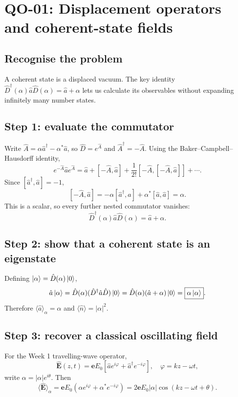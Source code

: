
\section{QO-01: Displacement operators and coherent-state fields}
\subsection*{Recognise the problem}
A coherent state is a displaced vacuum. The key identity
\(\hat D^\dagger(\alpha)\hat a\hat D(\alpha)=\hat a+\alpha\)
lets us calculate its observables without expanding infinitely many
number states.

\subsection*{Step 1: evaluate the commutator}
Write \(\hat A=\alpha\hat a^\dagger-\alpha^*\hat a\), so
\(\hat D=e^{\hat A}\) and \(\hat A^\dagger=-\hat A\).
Using the Baker--Campbell--Hausdorff identity,
\[
e^{-\hat A}\hat a e^{\hat A}
=\hat a+[-\hat A,\hat a]
+\frac1{2!}[-\hat A,[-\hat A,\hat a]]+\cdots .
\]
Since \([\hat a^\dagger,\hat a]=-1\),
\[
[-\hat A,\hat a]=-\alpha[\hat a^\dagger,\hat a]
+\alpha^*[\hat a,\hat a]=\alpha .
\]
This is a scalar, so every further nested commutator vanishes:
\[
\boxed{\hat D^\dagger(\alpha)\hat a\hat D(\alpha)=\hat a+\alpha.}
\]

\subsection*{Step 2: show that a coherent state is an eigenstate}
Defining \(\left\lvert \alpha\right\rangle=\hat D(\alpha)\left\lvert 0\right\rangle\),
\[
\hat a\left\lvert \alpha\right\rangle
=\hat D(\alpha)(\hat D^\dagger\hat a\hat D)\left\lvert 0\right\rangle
=\hat D(\alpha)(\hat a+\alpha)\left\lvert 0\right\rangle
=\boxed{\alpha\left\lvert \alpha\right\rangle}.
\]
Therefore \(\langle\hat a\rangle_\alpha=\alpha\) and
\(\langle\hat n\rangle=|\alpha|^2\).

\subsection*{Step 3: recover a classical oscillating field}
For the Week 1 travelling-wave operator,
\[
\hat{\mathbf E}(z,t)=\mathbf e E_0
[\hat a e^{i\varphi}+\hat a^\dagger e^{-i\varphi}],
\quad \varphi=kz-\omega t,
\]
write \(\alpha=|\alpha|e^{i\theta}\). Then
\[
\langle\hat{\mathbf E}\rangle_\alpha
=\mathbf eE_0(\alpha e^{i\varphi}+\alpha^*e^{-i\varphi})
=\boxed{2\mathbf e E_0|\alpha|\cos(kz-\omega t+\theta)}.
\]
